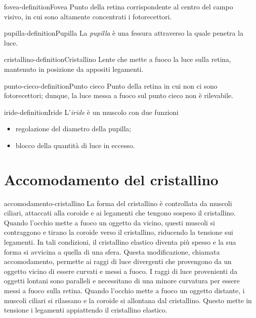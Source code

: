 \documentclass[preview]{standalone}
\begin{document}
\begin{snippetdefinition}{fovea-definition}{Fovea}
    Punto della retina corrispondente al centro del campo visivo, in cui sono altamente
    concentrati i fotorecettori.
\end{snippetdefinition}

\begin{snippetdefinition}{pupilla-definition}{Pupilla}
    La \textit{pupilla} è una fessura attraverso la quale penetra la luce. 
\end{snippetdefinition}

\begin{snippetdefinition}{cristallino-definition}{Cristallino}
    Lente che mette a fuoco la luce sulla retina, mantenuto in posizione da appositi legamenti.
\end{snippetdefinition}

\begin{snippetdefinition}{punto-cieco-definition}{Punto cieco}
    Punto della retina in cui non ci sono fotorecettori; dunque, la luce messa a fuoco sul punto
    cieco non è rilevabile.
\end{snippetdefinition}

\begin{snippetdefinition}{iride-definition}{Iride}
    L'\textit{iride} è un muscolo con due funzioni
    \begin{itemize}
        \item regolazione del diametro della pupilla;
        \item blocco della quantità di luce in eccesso.
    \end{itemize}
\end{snippetdefinition}

\section{Accomodamento del cristallino}

\begin{snippet}{accomodamento-cristallino}
    La forma del cristallino è controllata da muscoli ciliari, attaccati alla coroide e ai legamenti
che tengono sospeso il cristallino. Quando l'occhio mette a fuoco un oggetto da vicino,
questi muscoli si contraggono e tirano la coroide verso il cristallino, riducendo la tensione
sui legamenti. In tali condizioni, il cristallino elastico diventa più spesso e la sua forma si
avvicina a quella di una sfera. Questa modificazione, chiamata accomodamento, permette
ai raggi di luce divergenti che provengono da un oggetto vicino di essere curvati e messi a
fuoco. I raggi di luce provenienti da oggetti lontani sono paralleli e necessitano di una minore
curvatura per essere messi a fuoco sulla retina. Quando l'occhio mette a fuoco un oggetto
distante, i muscoli ciliari si rilassano e la coroide si allontana dal cristallino. Questo mette in
tensione i legamenti appiattendo il cristallino elastico.
\end{snippet}
\end{document}

